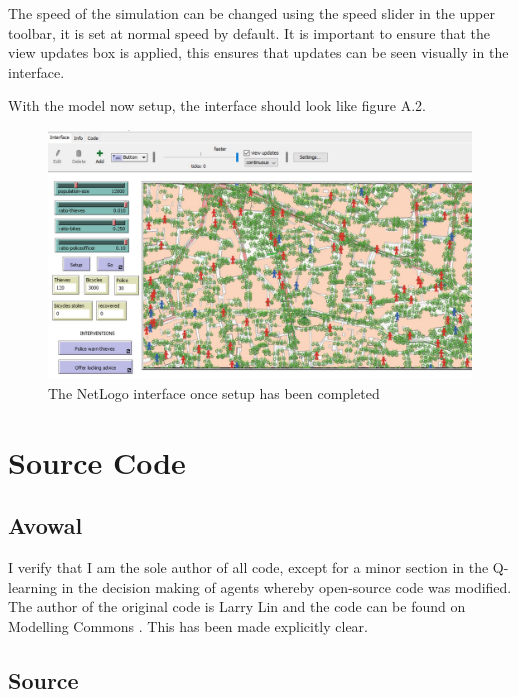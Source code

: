 \documentclass[11pt]{informatics-report}
\begin{document}
The speed of the simulation can be changed using the speed slider in the upper toolbar, it is set at normal speed by default. It is important to ensure that the view updates box is applied, this ensures that updates can be seen visually in the interface. \par

With the model now setup, the interface should look like figure A.2. 

\begin{figure}
\includegraphics[scale = 0.4]{setup.png}
\caption{The NetLogo interface once setup has been completed}
\end{figure}

\chapter{Source Code}
\section{Avowal}
I verify that I am the sole author of all code, except for a minor section in the Q-learning in the decision making of agents whereby open-source code was modified. The author of the original code is Larry Lin and the code can be found on Modelling Commons \cite{larry}. This has been made explicitly clear.

\section{Source}
 
\end{document}

